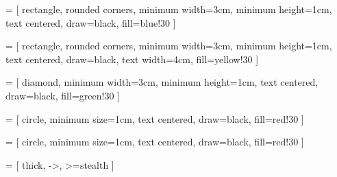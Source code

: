 
\usepackage{tikz}

\usetikzlibrary{shapes.geometric, arrows}


 = [ rectangle, rounded corners,
   minimum width=3cm, minimum height=1cm, text centered,
draw=black, fill=blue!30 ]

 = [ rectangle, rounded corners,
   minimum width=3cm, minimum height=1cm, text centered,
draw=black, text width=4cm, fill=yellow!30 ]

 = [ diamond, minimum width=3cm,
   minimum height=1cm, text centered, draw=black,
fill=green!30 ]

 = [ circle, minimum size=1cm,
text centered, draw=black, fill=red!30 ]

 = [ circle, minimum size=1cm,
text centered, draw=black, fill=red!30 ]

 = [ thick, ->, >=stealth ]

